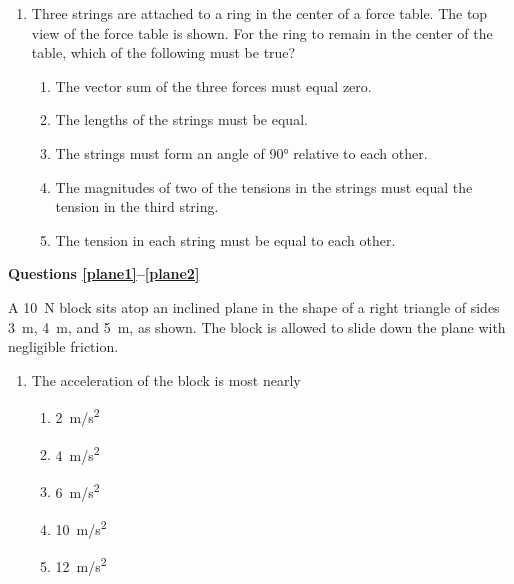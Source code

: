 \documentclass{../../oss-apphys}
\begin{document}
\begin{multicols}{2}
\begin{enumerate}[resume,leftmargin=18pt]

  \item Three strings are attached to a ring in the center of a force table. The
    top view of the force table is shown. For the ring to remain in the
    center of the table, which of the following must be true?
    \begin{enumerate}[noitemsep,topsep=0pt,leftmargin=18pt,label=(\Alph*)]
    \item The vector sum of the three forces must equal zero.
    \item The lengths of the strings must be equal.
    \item The strings must form an angle of \ang{90} relative to each other.
    \item The magnitudes of two of the tensions in the strings must equal the
      tension in the third string.
    \item The tension in each string must be equal to each other.
    \end{enumerate}  
  \end{enumerate}
  \columnbreak
  
  \textbf{Questions \ref{plane1}--\ref{plane2}}

  A \SI{10}{\newton} block sits atop an inclined plane in the shape of a
  right triangle of sides \SI{3}{\metre}, \SI{4}{\metre}, and \SI{5}{\metre},
  as shown. The block is allowed to slide down the plane with negligible
  friction.
  \vspace{-.2in}
  
  \begin{enumerate}[resume,leftmargin=18pt]
  \item The acceleration of the block is most nearly
    \begin{enumerate}[noitemsep,topsep=0pt,leftmargin=18pt,label=(\Alph*)]
    \item\SI{2}{m/s^2}
    \item\SI{4}{m/s^2}
    \item\SI{6}{m/s^2}
    \item\SI{10}{m/s^2}
    \item\SI{12}{m/s^2}
    \end{enumerate}
    \label{plane1}
    

\end{enumerate}
\end{multicols}
\end{document}
